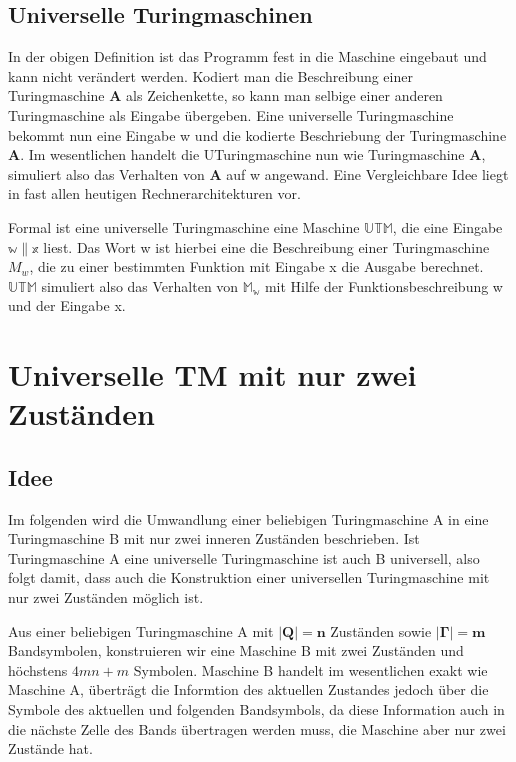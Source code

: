 \documentclass[12pt, a4paper]{article}
\begin{document}
 

\subsection{Universelle Turingmaschinen}



In der obigen Definition ist das Programm fest in die Maschine eingebaut und kann nicht verändert werden. Kodiert man die Beschreibung einer Turingmaschine \textbf{A} als Zeichenkette, so kann man selbige einer anderen Turingmaschine als Eingabe übergeben.
Eine universelle Turingmaschine bekommt nun eine Eingabe w und die kodierte Beschriebung der Turingmaschine \textbf{A}. Im wesentlichen handelt die UTuringmaschine nun wie Turingmaschine \textbf{A}, simuliert also das Verhalten von \textbf{A} auf w angewand.
Eine Vergleichbare Idee liegt in fast allen heutigen Rechnerarchitekturen vor.

Formal ist eine universelle Turingmaschine eine Maschine $\mathbb{UTM}$, die eine Eingabe $ \mathbb{ w \| x } $ liest. Das Wort w ist hierbei eine  die Beschreibung einer Turingmaschine $M_{w}$, die zu einer bestimmten Funktion mit Eingabe x die Ausgabe berechnet. $\mathbb{UTM}$ simuliert also das Verhalten von $\mathbb{M_{w}}$ mit Hilfe der Funktionsbeschreibung w und der Eingabe x.


\section{Universelle TM mit nur zwei Zuständen}
\subsection{Idee}

Im folgenden wird die Umwandlung einer beliebigen Turingmaschine A in eine Turingmaschine B mit nur zwei inneren Zuständen beschrieben. Ist Turingmaschine A eine universelle Turingmaschine ist auch B universell, also folgt damit, dass auch die Konstruktion einer universellen Turingmaschine mit nur zwei Zuständen möglich ist.

Aus einer beliebigen Turingmaschine A mit $\mathbf{|Q| = n}$ Zuständen sowie $\mathbf{|\Gamma| = m}$ Bandsymbolen, konstruieren wir eine Maschine B mit zwei Zuständen und höchstens $4mn + m$ Symbolen. Maschine B handelt im wesentlichen exakt wie Maschine A, überträgt die Informtion des aktuellen Zustandes jedoch über die Symbole des aktuellen und folgenden Bandsymbols, da diese Information auch in die nächste Zelle des Bands übertragen werden muss, die Maschine aber nur zwei Zustände hat.
\end{document}
